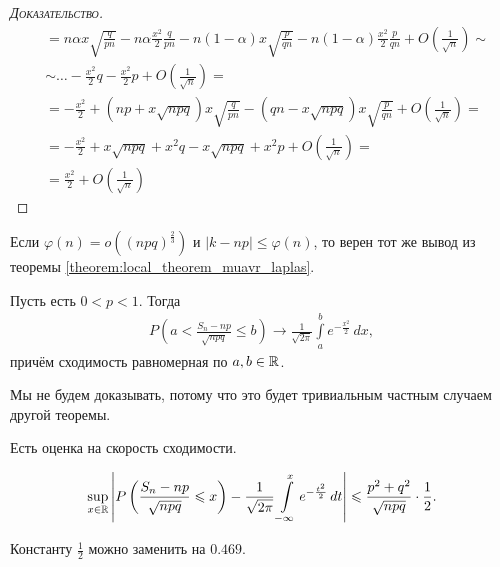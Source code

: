\begin{proof}[\normalfont\textsc{Доказательство}]
\begin{align*}
  &= n\alpha x \sqrt{\frac{q}{pn}} - n\alpha \frac{x^{2}}{2}\frac{q}{pn} - n(1-\alpha)x \sqrt{\frac{p}{qn}} - n(1-\alpha)\frac{x^{2}}{2} \frac{p}{qn} + O\left(\frac{1}{\sqrt{n}}\right) \sim \\
  &\sim \ldots - \frac{x^{2}}{2}q - \frac{x^{2}}{2}p + O\left(\frac{1}{\sqrt{n}}\right) = \\
  &= -\frac{x^{2}}{2} + \left( np + x\sqrt{npq} \right)x \sqrt{\frac{q}{pn}} - (qn - x\sqrt{npq})x\sqrt{\frac{p}{qn}} + O \left( \frac{1}{\sqrt{n}} \right) = \\
  &= -\frac{x^{2}}{2} + x\sqrt{npq} + x^{2}q - x\sqrt{npq} + x^{2}p + O \left( \frac{1}{\sqrt{n}} \right) = \\
  &= \frac{x^{2}}{2} + O \left( \frac{1}{\sqrt{n}} \right)
 \end{align*} 
\end{proof}

\begin{remrk}
 Если $\varphi(n) = o((npq)^{\frac{2}{3}})$ и $\left| k-np \right| \leqslant \varphi(n)$, то верен тот же вывод из теоремы \ref{theorem:local_theorem_muavr_laplas}.
\end{remrk}

\begin{thm}
 \label{theorem:intergram_theorem_muavr_laplas}
 Пусть есть $0 < p < 1$. Тогда
 \begin{align*}
  P\left(a < \frac{S_n - np}{\sqrt{npq}} \leqslant b\right) \to \frac{1}{\sqrt{2\pi}} \int\limits_{a}^{b} e^{-\frac{x^{2}}{2}}\,dx
 ,\end{align*} причём сходимость равномерная по $a, b \in \mathbb{R}$.
\end{thm}

Мы не будем доказывать, потому что это будет тривиальным частным случаем другой теоремы.

Есть оценка на скорость сходимости.

\begin{thm}
 \begin{align*}
  \sup_{x \in \mathbb{R}} \left| P \left( \frac{S_n - np}{\sqrt{npq}} \leqslant x \right) - \frac{1}{\sqrt{2\pi}} \int\limits_{-\infty}^{x} e^{-\frac{t^{2}}{2}}\, dt \right| \leqslant \frac{p^{2}+q^{2}}{\sqrt{npq}} \cdot \frac{1}{2}
 .\end{align*}
\end{thm}

\begin{remrk*}
 Константу $\frac{1}{2}$ можно заменить на $0.469$.
\end{remrk*}

